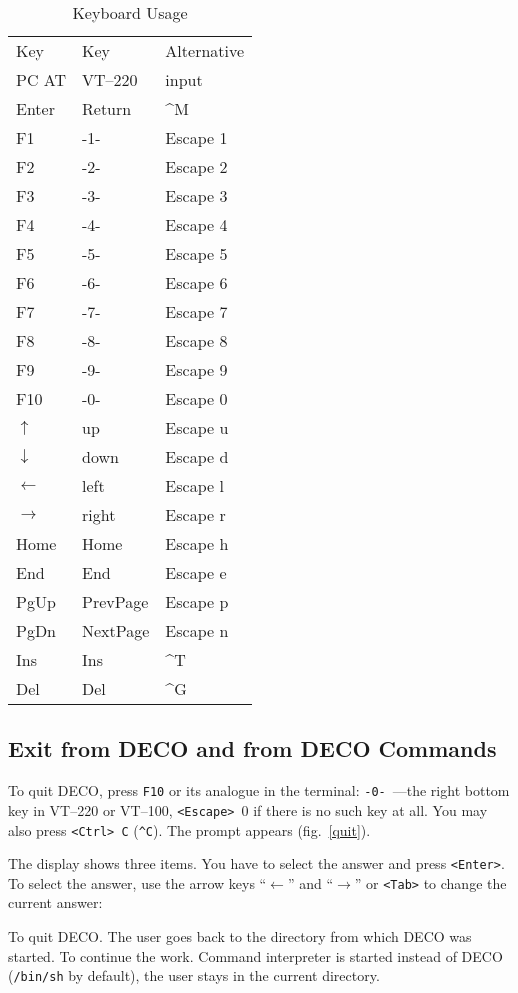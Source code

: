 \begin{table}[bp]
\begin{center}
\begin{tabular}{|l|l|l|}
\hline
Key & Key & Alternative \\
PC AT & VT--220 & input \\
\hline
Enter & Return & \^{}M \\
F1 & -1- & Escape 1 \\
F2 & -2- & Escape 2 \\
F3 & -3- & Escape 3 \\
F4 & -4- & Escape 4 \\
F5 & -5- & Escape 5 \\
F6 & -6- & Escape 6 \\
F7 & -7- & Escape 7 \\
F8 & -8- & Escape 8 \\
F9 & -9- & Escape 9 \\
F10 & -0- & Escape 0 \\
$\uparrow$ & up & Escape u \\
$\downarrow$ & down & Escape d \\
$\leftarrow$ & left & Escape l \\
$\rightarrow$ & right & Escape r \\
Home & Home & Escape h \\
End & End & Escape e \\
PgUp & PrevPage & Escape p \\
PgDn & NextPage & Escape n \\
Ins & Ins & \^{}T \\
Del & Del & \^{}G \\
\hline
\end{tabular}
\caption{Keyboard Usage}
\label{keyboard}
\end{center}
\end{table}

\subsection{Exit from DECO and from DECO Commands}

To quit DECO, press {\tt F10} or its analogue in the
terminal: {\tt -0-}~---the right bottom key in VT--220 or VT--100,
{\tt <Escape>}~0 if there is no such key at all. You may also
press {\tt <Ctrl>~C} ({\tt \^{}C}). The prompt appears (fig.~\ref{quit}).
 

The display shows three items.
You have to select the answer and press
{\tt <Enter>}. To select the answer, use the arrow keys ``$\leftarrow$'' and
``$\rightarrow$'' or {\tt <Tab>} to change the current answer:
\begin{example}
To quit DECO. The user goes back to the directory from which DECO was started.
To continue the work.
Command interpreter is started instead of DECO ({\tt /bin/sh} by default),
the user stays in the current directory.
\end{example}

